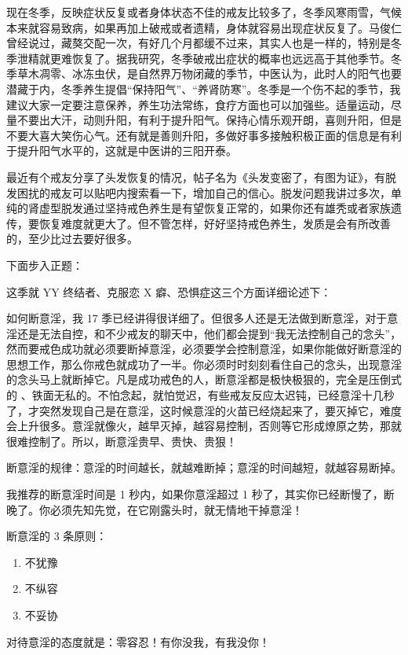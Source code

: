 \documentclass[fontset=founder]{ctexart}
\begin{document}
现在冬季，反映症状反复或者身体状态不佳的戒友比较多了，冬季风寒雨雪，气候本来就容易致病，如果再加上破戒或者遗精，身体就容易出现症状反复了。马俊仁曾经说过，藏獒交配一次，有好几个月都缓不过来，其实人也是一样的，特别是冬季泄精就更难恢复了。据我研究，冬季破戒出症状的概率也远远高于其他季节。冬季草木凋零、冰冻虫伏，是自然界万物闭藏的季节，中医认为，此时人的阳气也要潜藏于内，冬季养生提倡“保持阳气”、“养肾防寒”。冬季是一个伤不起的季节，我建议大家一定要注意保养，养生功法常练，食疗方面也可以加强些。适量运动，尽量不要出大汗，动则升阳，有利于提升阳气。保持心情乐观开朗，喜则升阳，但是不要大喜大笑伤心气。还有就是善则升阳，多做好事多接触积极正面的信息是有利于提升阳气水平的，这就是中医讲的三阳开泰。

最近有个戒友分享了头发恢复的情况，帖子名为《头发变密了，有图为证》，有脱发困扰的戒友可以贴吧内搜索看一下，增加自己的信心。脱发问题我讲过多次，单纯的肾虚型脱发通过坚持戒色养生是有望恢复正常的，如果你还有雄秃或者家族遗传，要恢复难度就更大了。但不管怎样，好好坚持戒色养生，发质是会有所改善的，至少比过去要好很多。

下面步入正题：

这季就 YY 终结者、克服恋 X 癖、恐惧症这三个方面详细论述下：

如何断意淫，我 17 季已经讲得很详细了。但很多人还是无法做到断意淫，对于意淫还是无法自控，和不少戒友的聊天中，他们都会提到“我无法控制自己的念头”，然而要戒色成功就必须要断掉意淫，必须要学会控制意淫，如果你能做好断意淫的思想工作，那么你戒色就成功了一半。你必须时时刻刻看住自己的念头，出现意淫的念头马上就断掉它。凡是成功戒色的人，断意淫都是极快极狠的，完全是压倒式的 、铁面无私的。不怕念起，就怕觉迟，有些戒友反应太迟钝，已经意淫十几秒了，才突然发现自己是在意淫，这时候意淫的火苗已经烧起来了，要灭掉它，难度会上升很多。意淫就像火，越早灭掉，越容易控制，否则等它形成燎原之势，那就很难控制了。所以，断意淫贵早、贵快、贵狠！

断意淫的规律：意淫的时间越长，就越难断掉；意淫的时间越短，就越容易断掉。

我推荐的断意淫时间是 1 秒内，如果你意淫超过 1 秒了，其实你已经断慢了，断晚了。你必须先知先觉，在它刚露头时，就无情地干掉意淫！

断意淫的 3 条原则：

\begin{enumerate}
    \item 不犹豫
    \item 不纵容
    \item 不妥协
\end{enumerate}

对待意淫的态度就是：零容忍！有你没我，有我没你！
\end{document}
